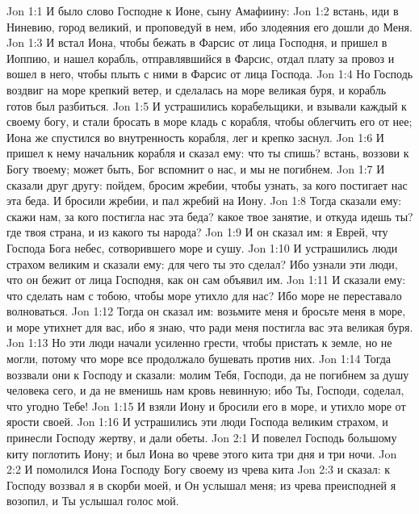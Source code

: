 \vs Jon 1:1 И было слово Господне к Ионе, сыну Амафиину:
\vs Jon 1:2 встань, иди в Ниневию, город великий, и проповедуй в нем, ибо злодеяния его дошли до Меня.
\vs Jon 1:3 И встал Иона, чтобы бежать в Фарсис от лица Господня, и пришел в Иоппию, и нашел корабль, отправлявшийся в Фарсис, отдал плату за провоз и вошел в него, чтобы плыть с ними в Фарсис от лица Господа.
\vs Jon 1:4 Но Господь воздвиг на море крепкий ветер, и сделалась на море великая буря, и корабль готов был разбиться.
\vs Jon 1:5 И устрашились корабельщики, и взывали каждый к своему богу, и стали бросать в море кладь с корабля, чтобы облегчить его от нее; Иона же спустился во внутренность корабля, лег и крепко заснул.
\vs Jon 1:6 И пришел к нему начальник корабля и сказал ему: что ты спишь? встань, воззови к Богу твоему; может быть, Бог вспомнит о нас, и мы не погибнем.
\vs Jon 1:7 И сказали друг другу: пойдем, бросим жребии, чтобы узнать, за кого постигает нас эта беда. И бросили жребии, и пал жребий на Иону.
\vs Jon 1:8 Тогда сказали ему: скажи нам, за кого постигла нас эта беда? какое твое занятие, и откуда идешь ты? где твоя страна, и из какого ты народа?
\vs Jon 1:9 И он сказал им: я Еврей, чту Господа Бога небес, сотворившего море и сушу.
\vs Jon 1:10 И устрашились люди страхом великим и сказали ему: для чего ты это сделал? Ибо узнали эти люди, что он бежит от лица Господня, как он сам объявил им.
\vs Jon 1:11 И сказали ему: что сделать нам с тобою, чтобы море утихло для нас? Ибо море не переставало волноваться.
\vs Jon 1:12 Тогда он сказал им: возьмите меня и бросьте меня в море, и море утихнет для вас, ибо я знаю, что ради меня постигла вас эта великая буря.
\vs Jon 1:13 Но эти люди начали усиленно грести, чтобы пристать к земле, но не могли, потому что море все продолжало бушевать против них.
\vs Jon 1:14 Тогда воззвали они к Господу и сказали: молим Тебя, Господи, да не погибнем за душу человека сего, и да не вменишь нам кровь невинную; ибо Ты, Господи, соделал, что угодно Тебе!
\vs Jon 1:15 И взяли Иону и бросили его в море, и утихло море от ярости своей.
\vs Jon 1:16 И устрашились эти люди Господа великим страхом, и принесли Господу жертву, и дали обеты.
\vs Jon 2:1 И повелел Господь большому киту поглотить Иону; и был Иона во чреве этого кита три дня и три ночи.
\vs Jon 2:2 И помолился Иона Господу Богу своему из чрева кита
\vs Jon 2:3 и сказал: к Господу воззвал я в скорби моей, и Он услышал меня; из чрева преисподней я возопил, и Ты услышал голос мой.
